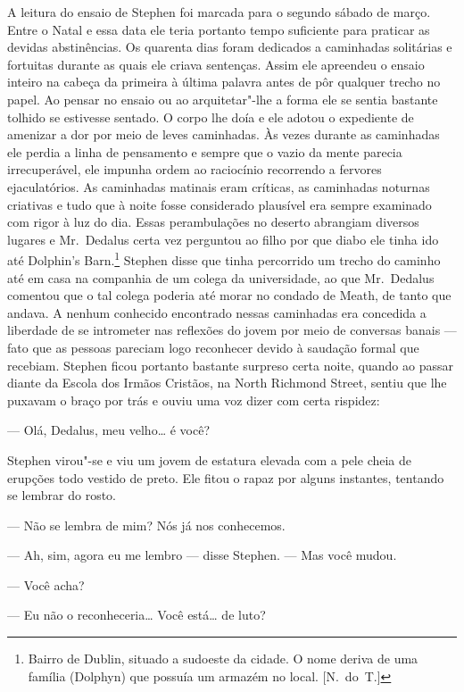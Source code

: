 A leitura do ensaio de Stephen foi marcada para o segundo sábado de
março.  Entre o Natal e essa data ele teria portanto tempo suficiente
para praticar as devidas abstinências.  Os quarenta dias foram
dedicados a caminhadas solitárias e fortuitas durante as quais ele
criava sentenças.  Assim ele apreendeu o ensaio inteiro na cabeça \label{da"-primeira} da
primeira à última palavra antes de pôr qualquer trecho no papel.  Ao
pensar no ensaio ou ao arquitetar"-lhe a forma ele se sentia bastante
\label{tolhido"-se} tolhido se estivesse sentado.  O corpo lhe doía e ele adotou o
expediente de amenizar a dor por meio de leves caminhadas.  Às vezes
durante as caminhadas ele perdia a linha de pensamento e sempre que o
vazio da mente parecia irrecuperável, ele impunha ordem ao raciocínio
recorrendo a fervores ejaculatórios.  As caminhadas matinais eram
críticas, as caminhadas noturnas criativas e tudo que à noite fosse
considerado plausível era sempre examinado com rigor à luz do dia.
Essas perambulações no deserto abrangiam diversos lugares e Mr.~Dedalus 
certa vez perguntou ao filho por que diabo ele tinha ido até
\label{dolphin"-s} Dolphin’s Barn.\footnote{ Bairro de Dublin, situado a sudoeste da
cidade.  O nome deriva de uma família (Dolphyn) que possuía um
armazém no local. [N.~do~T.]}  Stephen disse que tinha percorrido um
trecho do caminho até em casa na companhia de um colega da
universidade, ao que Mr.~Dedalus comentou que o tal colega poderia até
morar no condado de Meath, de tanto que andava.  A nenhum conhecido
encontrado nessas caminhadas era concedida a liberdade de se intrometer
nas reflexões do jovem por meio de conversas banais --- fato que as
pessoas pareciam logo reconhecer devido à saudação formal que recebiam.
Stephen ficou portanto bastante surpreso certa noite, quando ao passar
diante da Escola dos Irmãos Cristãos, na North Richmond Street, sentiu		
que lhe puxavam o braço por trás e ouviu uma voz dizer com certa rispidez:

--- Olá, Dedalus, meu velho\ldots{} é você?

Stephen virou"-se e viu um jovem de estatura elevada com a pele cheia
de erupções todo vestido de preto.  Ele fitou o rapaz por alguns
instantes, tentando se lembrar do rosto.

--- Não se lembra de mim?  Nós já nos conhecemos.

--- Ah, sim, agora eu me lembro --- disse Stephen.  --- Mas você
mudou.

--- Você acha?

--- Eu não o reconheceria\ldots{}  Você está\ldots{} de luto?

